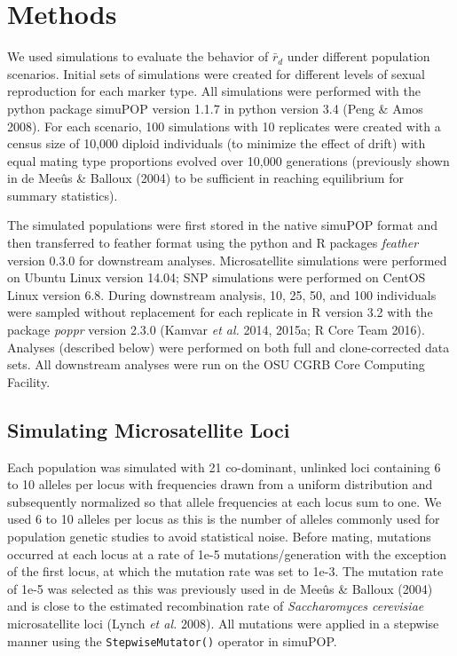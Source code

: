\documentclass[]{article}
\theoremstyle{definition}
\theoremstyle{definition}
\theoremstyle{remark}
\begin{document}
\section{Methods}\label{methods}

We used simulations to evaluate the behavior of \(\bar{r}_d\) under
different population scenarios. Initial sets of simulations were created
for different levels of sexual reproduction for each marker type. All
simulations were performed with the python package simuPOP version 1.1.7
in python version 3.4 (Peng \& Amos 2008). For each scenario, 100
simulations with 10 replicates were created with a census size of 10,000
diploid individuals (to minimize the effect of drift) with equal mating
type proportions evolved over 10,000 generations (previously shown in de
Meeûs \& Balloux (2004) to be sufficient in reaching equilibrium for
summary statistics).

The simulated populations were first stored in the native simuPOP format
and then transferred to feather format using the python and R packages
\emph{feather} version 0.3.0 for downstream analyses. Microsatellite
simulations were performed on Ubuntu Linux version 14.04; SNP
simulations were performed on CentOS Linux version 6.8. During
downstream analysis, 10, 25, 50, and 100 individuals were sampled
without replacement for each replicate in R version 3.2 with the package
\emph{poppr} version 2.3.0 (Kamvar \emph{et al.} 2014, 2015a; R Core
Team 2016). Analyses (described below) were performed on both full and
clone-corrected data sets. All downstream analyses were run on the OSU
CGRB Core Computing Facility.

\subsection{Simulating Microsatellite
Loci}\label{simulating-microsatellite-loci}

Each population was simulated with 21 co-dominant, unlinked loci
containing 6 to 10 alleles per locus with frequencies drawn from a
uniform distribution and subsequently normalized so that allele
frequencies at each locus sum to one. We used 6 to 10 alleles per locus
as this is the number of alleles commonly used for population genetic
studies to avoid statistical noise. Before mating, mutations occurred at
each locus at a rate of 1e-5 mutations/generation with the exception of
the first locus, at which the mutation rate was set to 1e-3. The
mutation rate of 1e-5 was selected as this was previously used in de
Meeûs \& Balloux (2004) and is close to the estimated recombination rate
of \emph{Saccharomyces cerevisiae} microsatellite loci (Lynch \emph{et
al.} 2008). All mutations were applied in a stepwise manner using the
\texttt{StepwiseMutator()} operator in simuPOP.
\end{document}
